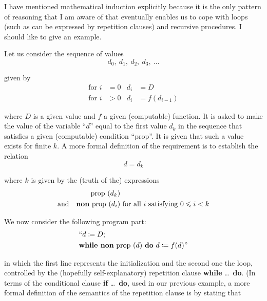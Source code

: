 I have mentioned mathematical induction explicitly because it is the only pattern of reasoning that I am aware of that eventually enables us to cope with loops (such as can be expressed by repetition clauses) and recursive procedures. I should like to give an example.

Let us consider the sequence of values
\begin{equation}
	\label{eq:induction-d}
	d_0,\ d_1,\ d_2,\ d_3,\ \dotso
\end{equation}

\noindent
given by
\begin{subequations}
\begin{align}
	\label{eq:induction-for-a}
	\text{for } i &= 0 & d_i &= D \\
	\label{eq:induction-for-b}
	\text{for } i &> 0 & d_i &= f(d_{i-1})
\end{align}
\end{subequations}

\noindent
where $D$ is a given value and $f$ a given (computable) function. It is asked to make the value of the variable ``$d$'' equal to the first value $d_k$ in the sequence that satisfies a given (computable) condition ``prop''. It is given that such a value exists for finite $k$. A more formal definition of the requirement is to establish the relation
\begin{equation}
	\label{eq:induction-dk}
	d=d_k
\end{equation}

\noindent
where $k$ is given by the (truth of the) expressions
\begin{eqnarray}
	\label{eq:prod-dk}
	\text{prop } (d_k)& \\
	\label{eq:non-prop-i}
	\text{and}\quad \text{\textbf{non} prop }(d_i)&\text{ for all } i \text{ satisfying } 0 \leqslant i < k
\end{eqnarray}

We now consider the following program part:
\begin{equation}
	\label{eq:program-while-non-prop}
	\begin{split}
		&\text{``}d \coloneq D;\\
		&\text{\textbf{while non} prop }(d) \text{ \textbf{do} } d \coloneq f(d)\text{''}
	\end{split}
\end{equation}

\noindent
in which the first line represents the initialization and the second one the loop, controlled by the (hopefully self-explanatory) repetition clause \textbf{while} \dots\ \textbf{do}. (In terms of the conditional clause \textbf{if} \dots\ \textbf{do}, used in our previous example, a more formal definition of the semantics of the repetition clause is by stating
that
\medskip

